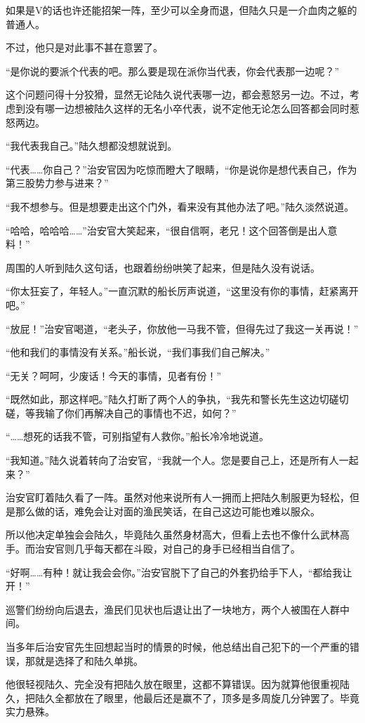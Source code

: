 如果是V的话也许还能招架一阵，至少可以全身而退，但陆久只是一介血肉之躯的普通人。

不过，他只是对此事不甚在意罢了。

“是你说的要派个代表的吧。那么要是现在派你当代表，你会代表那一边呢？”

这个问题问得十分狡猾，显然无论陆久说代表哪一边，都会惹怒另一边。不过，考虑到没有哪一边想被陆久这样的无名小卒代表，说不定他无论怎么回答都会同时惹怒两边。

“我代表我自己。”陆久想都没想就说到。

“代表……你自己？”治安官因为吃惊而瞪大了眼睛，“你是说你是想代表自己，作为第三股势力参与进来？”

“我不想参与。但是想要走出这个门外，看来没有其他办法了吧。”陆久淡然说道。

“哈哈，哈哈哈……”治安官大笑起来，“很自信啊，老兄！这个回答倒是出人意料！”

周围的人听到陆久这句话，也跟着纷纷哄笑了起来，但是陆久没有说话。

“你太狂妄了，年轻人。”一直沉默的船长厉声说道，“这里没有你的事情，赶紧离开吧。”

“放屁！”治安官喝道，“老头子，你放他一马我不管，但得先过了我这一关再说！”

“他和我们的事情没有关系。”船长说，“我们事我们自己解决。”

“无关？呵呵，少废话！今天的事情，见者有份！”

“既然如此，那这样吧。”陆久打断了两个人的争执，“我先和警长先生这边切磋切磋，等我输了你们再解决自己的事情也不迟，如何？”

“……想死的话我不管，可别指望有人救你。”船长冷冷地说道。

“我知道。”陆久说着转向了治安官，“我就一个人。您是要自己上，还是所有人一起来？”

治安官盯着陆久看了一阵。虽然对他来说所有人一拥而上把陆久制服更为轻松，但是那么做的话，难免会让对面的渔民笑话，在自己这边可能也难以服众。

所以他决定单独会会陆久，毕竟陆久虽然身材高大，但看上去也不像什么武林高手。而治安官则几乎每天都在斗殴，对自己的身手已经相当自信了。

“好啊……有种！就让我会会你。”治安官脱下了自己的外套扔给手下人，“都给我让开！”

巡警们纷纷向后退去，渔民们见状也后退让出了一块地方，两个人被围在人群中间。

当多年后治安官先生回想起当时的情景的时候，他总结出自己犯下的一个严重的错误，那就是选择了和陆久单挑。

他很轻视陆久、完全没有把陆久放在眼里，这都不算错误。因为就算他很重视陆久，把陆久全都放在了眼里，他最后还是赢不了，顶多是多周旋几分钟罢了。毕竟实力悬殊。

